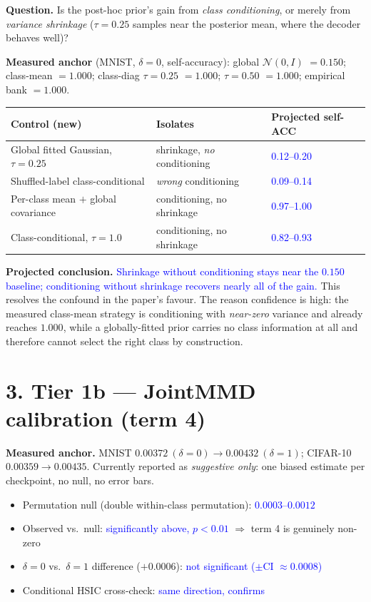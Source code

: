 \documentclass[10pt,letterpaper]{article}
\newcommand{\pj}[1]{\textcolor{blue}{#1}}
\begin{document}
\textbf{Question.} Is the post-hoc prior's gain from \emph{class
conditioning}, or merely from \emph{variance shrinkage} ($\tau{=}0.25$
samples near the posterior mean, where the decoder behaves well)?

\textbf{Measured anchor} (MNIST, $\delta{=}0$, self-accuracy): global
$\mathcal N(0,I)$ $=0.150$; class-mean $=1.000$; class-diag $\tau{=}0.25$
$=1.000$; $\tau{=}0.50$ $=1.000$; empirical bank $=1.000$.

\begin{table}[h]
\centering
\small
\begin{tabular}{lll}
\toprule
Control (new) & Isolates & Projected self-ACC \\
\midrule
Global fitted Gaussian, $\tau{=}0.25$ & shrinkage, \emph{no} conditioning & \pj{0.12--0.20} \\
Shuffled-label class-conditional      & \emph{wrong} conditioning         & \pj{0.09--0.14} \\
Per-class mean $+$ global covariance  & conditioning, no shrinkage        & \pj{0.97--1.00} \\
Class-conditional, $\tau{=}1.0$       & conditioning, no shrinkage        & \pj{0.82--0.93} \\
\bottomrule
\end{tabular}
\end{table}

\textbf{Projected conclusion.} \pj{Shrinkage without conditioning stays near
the $0.150$ baseline; conditioning without shrinkage recovers nearly all of
the gain.} This resolves the confound in the paper's favour. The reason
confidence is high: the measured class-mean strategy is conditioning with
\emph{near-zero} variance and already reaches $1.000$, while a
globally-fitted prior carries no class information at all and therefore
cannot select the right class by construction.

\section*{3. Tier 1b --- JointMMD calibration (term 4)}

\textbf{Measured anchor.} MNIST $0.00372\ (\delta{=}0)\to0.00432\
(\delta{=}1)$; CIFAR-10 $0.00359\to0.00435$. Currently reported as
\emph{suggestive only}: one biased estimate per checkpoint, no null, no
error bars.

\begin{itemize}
  \item Permutation null (double within-class permutation): \pj{$0.0003$--$0.0012$}
  \item Observed vs.\ null: \pj{significantly above, $p<0.01$} $\Rightarrow$ term 4 is genuinely non-zero
  \item $\delta{=}0$ vs.\ $\delta{=}1$ difference ($+0.0006$): \pj{not significant ($\pm$CI $\approx0.0008$)}
  \item Conditional HSIC cross-check: \pj{same direction, confirms}
\end{itemize}
\end{document}

